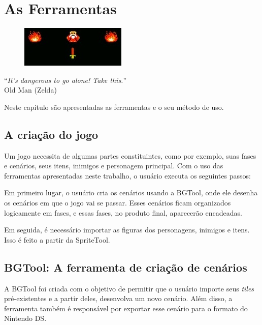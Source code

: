 \documentclass[brazil]{abnt}
\begin{document}
\chapter{As Ferramentas\label{cap:ferramentas}}

\vfill{}
\begin{flushright}{}
\begin{figure}[h!]
\hfill\includegraphics{imgs/oldman.jpg}
\end{figure}
``\emph{It's dangerous to go alone! Take this.}''\\
{\small Old Man (Zelda)}\end{flushright}{\small \par}
\vfill{}

Neste capítulo são apresentadas as ferramentas e o seu método de uso.
\newpage

\section{A criação do jogo\label{sec:workflow}}

Um jogo necessita de algumas partes constituintes, como por exemplo, suas fases e cenários, seus itens, inimigos e personagem principal. Com o uso das ferramentas apresentadas neste trabalho, o usuário executa os seguintes passos:

Em primeiro lugar, o usuário cria os cenários usando a BGTool, onde ele desenha os cenários em que o jogo vai se passar. Esses cenários ficam organizados logicamente em fases, e essas fases, no produto final, aparecerão encadeadas.

Em seguida, é necessário importar as figuras dos personagens, inimigos e itens. Isso é feito a partir da SpriteTool. 

\section{BGTool: A ferramenta de criação de cenários}

A BGTool foi criada com o objetivo de permitir que o usuário importe seus \textit{tiles} pré-existentes e a partir deles, desenvolva um novo cenário. Além disso, a ferramenta também é responsável por exportar esse cenário para o formato do Nintendo DS. 
\end{document}
